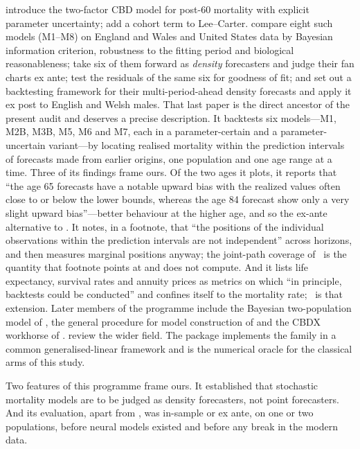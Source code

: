 \citet{cairns2006two} introduce the two-factor CBD model for post-60
mortality with explicit parameter uncertainty; \citet{renshaw2006cohort} add
a cohort term to Lee--Carter. \citet{cairns2009quantitative} compare eight
such models (M1--M8) on England and Wales and United States data by
Bayesian information criterion, robustness to the fitting period and
biological reasonableness; \citet{cairns2011mortality} take six of them
forward as \emph{density} forecasters and judge their fan charts ex ante;
\citet{dowd2010evaluating} test the residuals of the same six for goodness
of fit; and \citet{dowd2010backtesting} set out a backtesting framework for
their multi-period-ahead density forecasts and apply it ex post to English
and Welsh males. That last paper is the direct ancestor of the present
audit and deserves a precise description. It backtests six models---M1,
M2B, M3B, M5, M6 and M7, each in a parameter-certain and a
parameter-uncertain variant---by locating realised mortality within the
prediction intervals of forecasts made from earlier origins, one population
and one age range at a time. Three of its findings frame ours. Of the two
ages it plots, it reports that ``the age 65 forecasts have a notable
upward bias with the realized values often close to or below the lower
bounds, whereas the age 84 forecast show only a very slight upward
bias''---better behaviour at the higher age, and so the ex-ante
alternative to \Hfour. It notes, in a footnote, that ``the
positions of the individual observations within the prediction intervals
are not independent'' across horizons, and then measures marginal
positions anyway; the joint-path coverage of \Hthree\ is the quantity that
footnote points at and does not compute. And it lists life expectancy,
survival rates and annuity prices as metrics on which ``in principle,
backtests could be conducted'' and confines itself to the mortality rate;
\Hfive\ is that extension. Later members of the programme include the
Bayesian two-population model of \citet{cairns2011bayesian}, the general
procedure for model construction of \citet{hunt2014general} and the CBDX
workhorse of \citet{dowd2020cbdx}. \citet{booth2008mortality} review the
wider field. The  package \citep{villegas2018stmomo} implements
the family in a common generalised-linear framework and is the numerical
oracle for the classical arms of this study.

Two features of this programme frame ours. It established that stochastic
mortality models are to be judged as density forecasters, not point
forecasters. And its evaluation, apart from \citet{dowd2010backtesting}, was
in-sample or ex ante, on one or two populations, before neural models
existed and before any break in the modern data.

